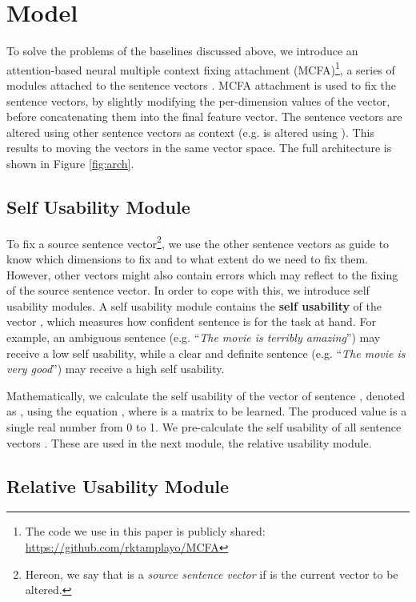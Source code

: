\documentclass{article}
\begin{document}
\section{Model}

To solve the problems of the baselines discussed above, we introduce an attention-based neural multiple context fixing attachment (MCFA)\footnote{The code we use in this paper is publicly shared: \url{https://github.com/rktamplayo/MCFA}}, a series of modules attached to the sentence vectors . MCFA attachment is used to fix the sentence vectors, by slightly modifying the per-dimension values of the vector, before concatenating them into the final feature vector. The sentence vectors are altered using other sentence vectors as context (e.g.  is altered using ). This results to moving the vectors in the same vector space.
The full architecture is 
shown in Figure \ref{fig:arch}.


\subsection{Self Usability Module}

To fix a source sentence vector\footnote{Hereon, we say that  is a \textit{source sentence vector} if  is the current vector to be altered.}, we use the other sentence vectors as guide to know which dimensions to fix and to what extent do we need to fix them. However, other vectors might also contain errors which may reflect to the fixing of the source sentence vector. In order to cope with this, we introduce self usability modules. A self usability module contains the \textbf{self usability} of the vector
, which measures how confident sentence  is for the task at hand. For example, an ambiguous sentence (e.g. ``\textit{The movie is terribly amazing}'') may receive a low self usability, while a clear
and definite 
sentence (e.g. ``\textit{The movie is very good}'') may receive a high self usability.


Mathematically, we calculate the self usability of the vector  of sentence , denoted as , using the equation , where  is a matrix to be learned. The produced value is a single real number from 0 to 1.
We pre-calculate the self usability of all sentence vectors . These are used in the next module, the relative usability module.

\subsection{Relative Usability Module}
\end{document}

